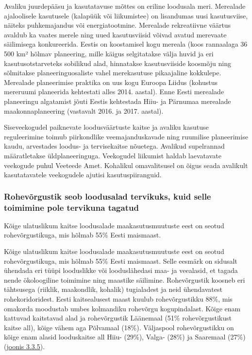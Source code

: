 \documentclass[estonian,]{article}
\begin{document}
Avaliku juurdepääsu ja kasutatavuse mõttes on eriline loodusala meri. Merealade ajaloolisele kasutusele (kalapüük või liikumistee) on lisandumas uusi kasutusviise, näiteks puhkemajandus või energiatootmine. Merealade rekreatiivne väärtus avaldub ka vaates merele ning uued kasutusviisid võivad avatud merevaate säilimisega konkureerida. Eestis on koostamisel kogu mereala (koos rannaalaga 36 500 km² hõlmav planeering, mille käigus selgitatakse välja huvid ja eri kasutusotstarveteks sobilikud alad, hinnatakse kasutusviiside koosmõju ning sõlmitakse planeeringuosaliste vahel merekasutuse pikaajaline kokkulepe. Merealade planeerimise praktika on uus kogu Euroopa Liidus (kohustus mereruumi planeerida kehtestati alles 2014. aastal). Enne Eesti merealade planeeringu algatamist jõuti Eestis kehtestada Hiiu- ja Pärnumaa merealade maakonnaplaneering (vastavalt 2016. ja 2017. aastal).

Siseveekogudel paiknevate loodusväärtuste kaitse ja avaliku kasutuse reguleerimine toimub piirkondlike veemajanduskavade ning ruumilise planeerimise kaudu, arvestades loodus- ja tervisekaitse nõuetega. Avalikud supelrannad määratletakse üldplaneeringuga. Veekogudel liikumist haldab laevatavate veekogude puhul Veeteede Amet. Kohalikul omavalitsusel on õigus seada avalikult kasutatavatele veekogudele ajutisi kasutuspiiranguid.

\hypertarget{rohevuxf5rgustik-seob-loodusalad-tervikuks-kuid-selle-toimimine-pole-tervikuna-tagatud}{%
\subsubsection*{Rohevõrgustik seob loodusalad tervikuks, kuid selle toimimine pole tervikuna tagatud}\label{rohevuxf5rgustik-seob-loodusalad-tervikuks-kuid-selle-toimimine-pole-tervikuna-tagatud}}

\begin{blockquote-right}
Kõige ulatuslikum kaitse loodusalade maakasutusmuutuste eest on seotud
rohevõrgustikuga, mis hõlmab 55\% Eesti maismaast.
\end{blockquote-right}

Kõige ulatuslikum kaitse loodusalade maakasutusmuutuste eest on seotud rohevõrgustikuga, mis hõlmab 55\% Eesti maismaast. Selle eesmärk on sidusalt ühendada eri tüüpi looduslikke või looduslähedasi maa- ja veealasid, et tagada nende ökoloogiline toimimine ning maastike säilimine. Rohevõrgustik koosneb eri tähtsusega (riiklik, maakondlik, kohalik) tugialadest ja neid ühendavatest rohekoridoridest. Eesti kaitsealusest maast kuulub rohevõrgustikku 88\%, mis omakorda moodustab umbes kolmandiku rohevõrgu kogupindalast. Kõige enam kattuvad kaitstavad alad ja rohevõrgustik Läänemaal (51\% rohevõrgustikust kaitse all), kõige vähem aga Põlvamaal (18\%). Väljaspool rohevõrgustikku on kõige enam alasid looduskaitse all Hiiu- (29\%), Valga- (28\%) ja Saaremaal (27\%) (\protect\hyperlink{figure335}{joonis 3.3.5}).
\end{document}
